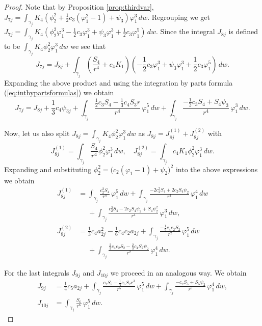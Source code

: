 \begin{proof}
Note that by Proposition \ref{prop:thirdvar}, $J_{7j}=\int_{\gamma_j}K_4(\phi_2^2+\frac{1}{2}c_3(\varphi_1^2-1)+\psi_3)\varphi_1^3\,dw $. Regrouping we get $J_{7j}=\int_{\gamma_j}K_4(\phi_2^2\varphi_1^3-\frac{1}{2}c_3\varphi_1^3+\psi_3\varphi_1^3+\frac{1}{2}c_3\varphi_1^5)\,dw$. Since the integral $J_{8j}$ is defined to be $\int_{\gamma_j}K_4\phi_2^2\varphi_1^3\,dw$ we see that 
\[ J_{7j}=J_{8j}+\int_{\gamma_j}\left(\frac{S_4}{r^4}+c_4K_1\right)\left(-\frac{1}{2}c_3\varphi_1^3+\psi_3\varphi_1^3+\frac{1}{2}c_3\varphi_1^5\right)\,dw. \]
Expanding the above product and using the integration by parts formula (\ref{eq:intbypartsformulas}) we obtain
\begin{equation}\label{eq:J7}
 J_{7j}=J_{8j}+\frac{1}{3}c_4\psi_{3j}+\int_{\gamma_j}\frac{\frac{1}{2}c_3S_4-\frac{1}{3}c_4S_3r}{r^4}\,\varphi_1^5\,dw + \int_{\gamma_j}\frac{-\frac{1}{2}c_3S_4+S_4\psi_3}{r^4}\,\varphi_1^3\,dw.
\end{equation}

Now, let us also split $J_{8j}=\int_{\gamma_j}K_4\phi_2^2\varphi_1^3\,dw$ as $J_{8j}=J_{8j}^{(1)}+J_{8j}^{(2)}$ with
\[ J_{8j}^{(1)}=\int_{\gamma_j}\frac{S_4}{r^4}\phi_2^2\varphi_1^3\,dw, \quad 
   J_{8j}^{(2)}=\int_{\gamma_j}c_4K_1\phi_2^2\varphi_1^3\,dw. \]
Expanding and substituting $\phi_2^2=\big(c_2(\varphi_1-1)+\psi_2\big)^2$ into the above expressions we obtain
\begin{align}
 J_{8j}^{(1)} &= 
\int_{\gamma_j}\frac{c_2^2S_4}{r^4}\,\varphi_1^5\,dw + \int_{\gamma_j}\frac{-2c_2^2S_4+2c_2S_4\psi_2}{r^4}\,\varphi_1^4\,dw \nonumber \\
&\phantom{=} + \int_{\gamma_j}\frac{c_2^2S_4-2c_2S_4\psi_2+S_4\psi_2^2}{r^4}\,\varphi_1^3\,dw, \label{eq:J8(1)} \\
 J_{8j}^{(2)} &= 
\frac{1}{3}c_4a_{2j}^2-\frac{1}{6}c_4c_2a_{2j}+\int_{\gamma_j}\frac{-\frac{1}{2}c_4c_2S_2}{r^2}\,\varphi_1^5\,dw \nonumber \\
&\phantom{=} +\int_{\gamma_j}\frac{\frac{2}{3}c_4c_2S_2-\frac{2}{3}c_4S_2\psi_2}{r^2}\,\varphi_1^4\,dw. \label{eq:J8(2)}
\end{align}

For the last integrals $J_{9j}$ and $J_{10j}$ we proceed in an analogous way. We obtain
\begin{align}
 J_{9j}&=\frac{1}{4}c_5a_{2j}+\int_{\gamma_j}\frac{c_2S_5-\frac{1}{4}c_5S_2r^3}{r^5}\,\varphi_1^5\,dw+\int_{\gamma_j}\frac{-c_2S_5+S_5\psi_2}{r^5}\,\varphi_1^4\,dw, \label{eq:J9} \\
 J_{10j}&=\int_{\gamma_j}\frac{S_6}{r^6}\,\varphi_1^5\,dw. \label{eq:J10}
\end{align}


\end{proof}
